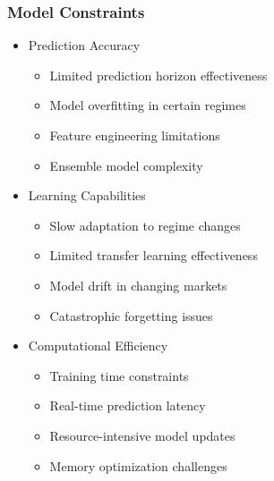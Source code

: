 \documentclass[conference]{IEEEtran}
\begin{document}
\subsubsection{Model Constraints}
\begin{itemize}
    \item Prediction Accuracy
    \begin{itemize}
        \item Limited prediction horizon effectiveness
        \item Model overfitting in certain regimes
        \item Feature engineering limitations
        \item Ensemble model complexity
    \end{itemize}
    
    \item Learning Capabilities
    \begin{itemize}
        \item Slow adaptation to regime changes
        \item Limited transfer learning effectiveness
        \item Model drift in changing markets
        \item Catastrophic forgetting issues
    \end{itemize}
    
    \item Computational Efficiency
    \begin{itemize}
        \item Training time constraints
        \item Real-time prediction latency
        \item Resource-intensive model updates
        \item Memory optimization challenges
    \end{itemize}
\end{itemize}
\end{document}
